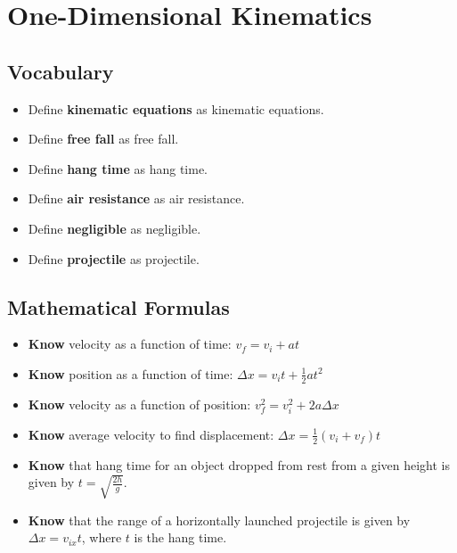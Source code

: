 \documentclass[dvipsnames]{article}
\begin{document}
\clearpage

\section{One-Dimensional Kinematics}

\subsection*{Vocabulary}

\begin{itemize}[topsep=-3pt,itemsep=0pt]
    \item Define \textbf{\gls{kinematic equations}} as \glsdesc{kinematic equations}.
    \item Define \textbf{\gls{free fall}} as \glsdesc{free fall}.
    \item Define \textbf{\gls{hang time}} as \glsdesc{hang time}.
    \item Define \textbf{\gls{air resistance}} as \glsdesc{air resistance}.
    \item Define \textbf{\gls{negligible}} as \glsdesc{negligible}.
    \item Define \textbf{\gls{projectile}} as \glsdesc{projectile}.
\end{itemize}

\subsection*{Mathematical Formulas}

\begin{itemize}[topsep=-3pt,itemsep=0pt]
    \item \textbf{Know} velocity as a function of time: $\displaystyle v_f = v_i + at$
    \item \textbf{Know} position as a function of time: $\displaystyle \Delta x = v_i t + \frac{1}{2}at^2$
    \item \textbf{Know} velocity as a function of position: $\displaystyle v_f^2 = v_i^2 + 2a\Delta x$
    \item \textbf{Know} average velocity to find displacement: $\displaystyle \Delta x = \frac{1}{2}(v_i + v_f)t$
    \item \textbf{Know} that hang time for an object dropped from rest from a given height is given by $\displaystyle t = \sqrt{\frac{2h}{g}}$.
    \item \textbf{Know} that the range of a horizontally launched projectile is given by $\Delta x = v_{ix} t$, where $t$ is the hang time.
\end{itemize}
\end{document}
